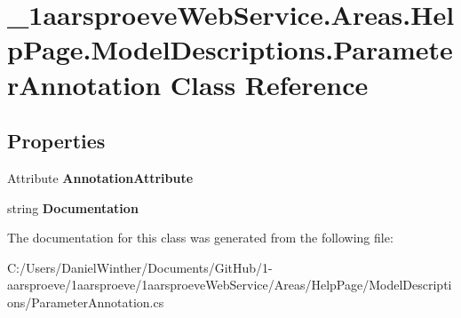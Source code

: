 \hypertarget{class__1aarsproeve_web_service_1_1_areas_1_1_help_page_1_1_model_descriptions_1_1_parameter_annotation}{}\section{\+\_\+1aarsproeve\+Web\+Service.\+Areas.\+Help\+Page.\+Model\+Descriptions.\+Parameter\+Annotation Class Reference}
\label{class__1aarsproeve_web_service_1_1_areas_1_1_help_page_1_1_model_descriptions_1_1_parameter_annotation}
\subsection*{Properties}
\begin{DoxyCompactItemize}
\item 
\hypertarget{class__1aarsproeve_web_service_1_1_areas_1_1_help_page_1_1_model_descriptions_1_1_parameter_annotation_acd0669e175d07c79c1ec50f2bd9ddc0a}{}Attribute {\bfseries Annotation\+Attribute}\label{class__1aarsproeve_web_service_1_1_areas_1_1_help_page_1_1_model_descriptions_1_1_parameter_annotation_acd0669e175d07c79c1ec50f2bd9ddc0a}

\item 
\hypertarget{class__1aarsproeve_web_service_1_1_areas_1_1_help_page_1_1_model_descriptions_1_1_parameter_annotation_a243d8f762b1bc6d9aa2bcef2b295f56d}{}string {\bfseries Documentation}\label{class__1aarsproeve_web_service_1_1_areas_1_1_help_page_1_1_model_descriptions_1_1_parameter_annotation_a243d8f762b1bc6d9aa2bcef2b295f56d}

\end{DoxyCompactItemize}


The documentation for this class was generated from the following file\+:\begin{DoxyCompactItemize}
\item 
C\+:/\+Users/\+Daniel\+Winther/\+Documents/\+Git\+Hub/1-\/aarsproeve/1aarsproeve/1aarsproeve\+Web\+Service/\+Areas/\+Help\+Page/\+Model\+Descriptions/Parameter\+Annotation.\+cs\end{DoxyCompactItemize}
